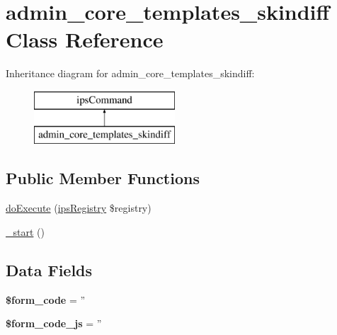 \hypertarget{classadmin__core__templates__skindiff}{\section{admin\-\_\-core\-\_\-templates\-\_\-skindiff Class Reference}
\label{classadmin__core__templates__skindiff}
}
Inheritance diagram for admin\-\_\-core\-\_\-templates\-\_\-skindiff\-:\begin{figure}[H]
\begin{center}
\leavevmode
\includegraphics[height=2.000000cm]{classadmin__core__templates__skindiff}
\end{center}
\end{figure}
\subsection*{Public Member Functions}
\begin{DoxyCompactItemize}
\item 
\hyperlink{classadmin__core__templates__skindiff_afbc4e912a0604b94d47d66744c64d8ba}{do\-Execute} (\hyperlink{classips_registry}{ips\-Registry} \$registry)
\item 
\hyperlink{classadmin__core__templates__skindiff_a43c71a826f71b672a21bd66606543789}{\-\_\-start} ()
\end{DoxyCompactItemize}
\subsection*{Data Fields}
\begin{DoxyCompactItemize}
\item 
\hypertarget{classadmin__core__templates__skindiff_af28aee726fa3eb6c355d08a2ab655e03}{{\bfseries \$form\-\_\-code} = ''}\label{classadmin__core__templates__skindiff_af28aee726fa3eb6c355d08a2ab655e03}

\item 
\hypertarget{classadmin__core__templates__skindiff_ac68fe8a02a2efd63c3271179f4b4fbb7}{{\bfseries \$form\-\_\-code\-\_\-js} = ''}\label{classadmin__core__templates__skindiff_ac68fe8a02a2efd63c3271179f4b4fbb7}

\end{DoxyCompactItemize}
